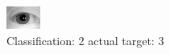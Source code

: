 \begin{figure}[h!]
\begin{center}
\includegraphics[width=0.60\columnwidth]{figures/ID1162_class_2_target_3.png}
\end{center}
\caption{ Classification: 2 actual target: 3}
\label{fig:ID1162_class_2_target_3}
\end{figure}
